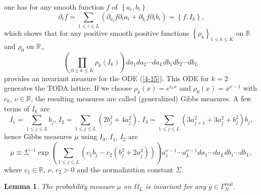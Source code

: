 \documentclass[a4paper]{article}%
\newtheorem{lemma}{Lemma}
\begin{document}
one has for any smooth function $f$ of $\left\{  a_{i},b_{i}\right\}  $
\[
\partial_{t}f=\sum_{1\leq i\leq L}\left(  \partial_{a_{i}}f\partial_{t}%
a_{i}+\partial_{b_{i}}f\partial_{t}b_{i}\right)  =\left\{  f,I_{k}\right\}
\text{,}%
\]
which shows that for any positive smooth positive functions $\left\{  \rho
_{k}\right\}  _{1\leq k\leq K}$ on $\mathbb{R}$ and $\rho_{0}$ on
$\mathbb{R}_{+}$
\[
\left(  \prod\limits_{0\leq k\leq K}\rho_{k}\left(  I_{k}\right)  \right)
da_{1}da_{2}\cdots da_{L}db_{1}db_{2}\cdots db_{L}%
\]
provides an invariant measure for the ODE (\ref{4-15}). This ODE for $k=2$
generates the TODA lattice. If we choose $\rho_{k}\left(  x\right)
=e^{c_{k}x}$ and $\rho_{0}\left(  x\right)  =x^{\nu-1}$ with $c_{k}$, $\nu
\in\mathbb{R}$, the resulting measures are called (generalized) Gibbs
measures. A few terms of $I_{k}$ are%
\[
I_{1}=\sum_{1\leq j\leq L}b_{j}\text{, \ }I_{2}=\sum_{1\leq j\leq L}\left(
2b_{j}^{2}+4a_{j}^{2}\right)  \text{, \ }I_{3}=\sum_{1\leq j\leq L}\left(
3a_{j+1}^{2}+3a_{j}^{2}+b_{j}^{2}\right)  b_{j}\text{,}%
\]
hence Gibbs measures $\mu$ using $I_{0}$, $I_{1}$, $I_{2}$ are%
\[
\mu\equiv\Sigma^{-1}\exp\left(  \sum_{1\leq j\leq L}\left(  c_{1}b_{j}%
-c_{2}\left(  b_{j}^{2}+2a_{j}^{2}\right)  \right)  \right)  a_{1}^{\nu
-1}\cdots a_{L}^{\nu-1}da_{1}\cdots da_{L}db_{1}\cdots db_{L}\text{,}%
\]
where $c_{1}\in\mathbb{R}$, $\nu$, $c_{2}>0$ and the normalization constant
$\Sigma$.

\begin{lemma}
\label{l4-4}The probability measure $\mu$ on $\Omega_{L}$ is invariant for any
$g\in\Gamma_{N}^{\operatorname{real}}$.
\end{lemma}
\end{document}
